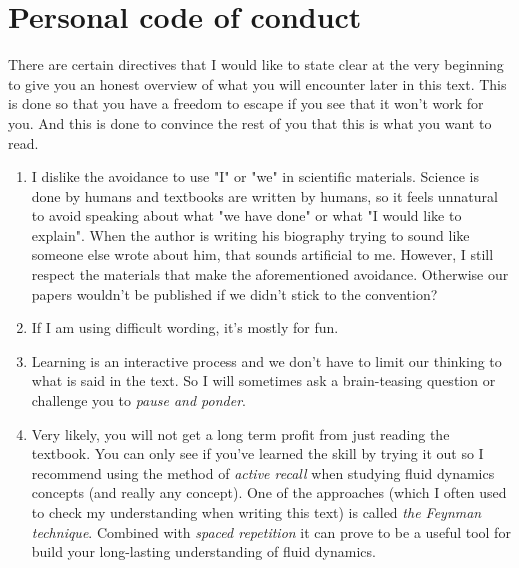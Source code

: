 \documentclass[10pt]{report}
\begin{document}
{\fontsize{12}{12}}

\vspace*{1cm}

{\fontsize{12}{12}}

\vspace*{0.5cm}

{\fontsize{12}{12}}

\vspace*{2cm}


\newpage

\chapter*{Personal code of conduct}
\thispagestyle{empty}
There are certain directives that I would like to state clear at the very beginning to give you an honest overview of what you will encounter later in this text. This is done so that you have a freedom to escape if you see that it won't work for you. And this is done to convince the rest of you that this is what you want to read.

\begin{enumerate}
\item I dislike the avoidance to use "I" or "we" in scientific materials. Science is done by humans and textbooks are written by humans, so it feels unnatural to avoid speaking about what "we have done" or what "I would like to explain". When the author is writing his biography trying to sound like someone else wrote about him, that sounds artificial to me. However, I still respect the materials that make the aforementioned avoidance. Otherwise our papers wouldn't be published if we didn't stick to the convention?
\item If I am using difficult wording, it's mostly for fun.
\item Learning is an interactive process and we don't have to limit our thinking to what is said in the text. So I will sometimes ask a brain-teasing question or challenge you to \textit{pause and ponder}.
\item Very likely, you will not get a long term profit from just reading the textbook. You can only see if you've learned the skill by trying it out so I recommend using the method of \textit{active recall} when studying fluid dynamics concepts (and really any concept). One of the approaches (which I often used to check my understanding when writing this text) is called \textit{the Feynman technique}. Combined with \textit{spaced repetition} it can prove to be a useful tool for build your long-lasting understanding of fluid dynamics.
\end{enumerate}
\end{document}
